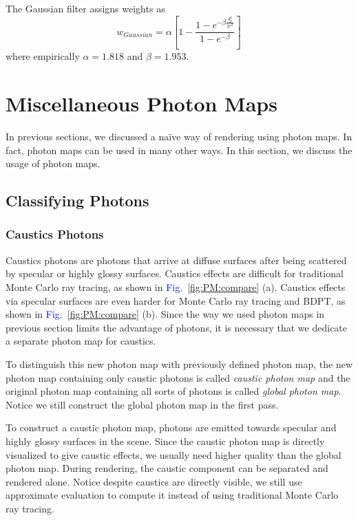 \documentclass[]{book}
\renewcommand{\figurename}{\textcolor{blue}{Fig.\ }}
\begin{document}
The Gaussian filter assigns weights as
\begin{equation*}
	w_{Gaussian} = \alpha \left[ 1-\frac{1-e^{-\beta \frac{d_p^2}{2r^2}}}{1-e^{-\beta}} \right]
\end{equation*}
where empirically $\alpha = 1.818$ and $\beta = 1.953$.

\section{Miscellaneous Photon Maps}
\label{sec:PM:more}
In previous sections, we discussed a na{\"i}ve way of rendering using photon maps.
In fact, photon maps can be used in many other ways.
In this section, we discuss the usage of photon maps.

\subsection{Classifying Photons}
\label{sec:PM:more:classes}
\subsubsection*{Caustics Photons}
Caustics photons are photons that arrive at diffuse surfaces after being scattered by specular or highly glossy surfaces.
Caustics effects are difficult for traditional Monte Carlo ray tracing, as shown in \figurename \ref{fig:PM:compare} (a).
Caustics effects via specular surfaces are even harder for Monte Carlo ray tracing and BDPT, as shown in \figurename \ref{fig:PM:compare} (b).
Since the way we used photon maps in previous section limits the advantage of photons, it is necessary that we dedicate a separate photon map for caustics.

To distinguish this new photon map with previously defined photon map, the new photon map containing only caustic photons is called \textit{caustic photon map} and the original photon map containing all sorts of photons is called \textit{global photon map}.
Notice we still construct the global photon map in the first pass.

To construct a caustic photon map, photons are emitted towards specular and highly glossy surfaces in the scene.
Since the caustic photon map is directly visualized to give caustic effects, we usually need higher quality than the global photon map.
During rendering, the caustic component can be separated and rendered alone.
Notice despite caustics are directly visible, we still use approximate evaluation to compute it instead of using traditional Monte Carlo ray tracing.
\end{document}
